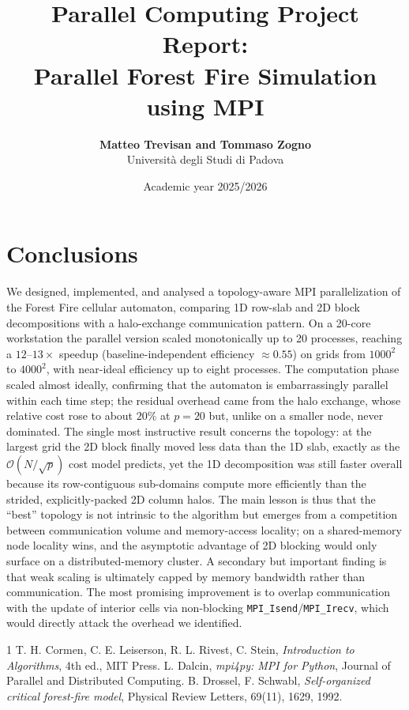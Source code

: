 \documentclass[10pt,a4paper]{article}
\title{\textbf{Parallel Computing Project Report:\\ Parallel Forest Fire Simulation using MPI}}
\author{\textbf{Matteo Trevisan and Tommaso Zogno} \\ Università degli Studi di Padova}
\date{Academic year 2025/2026}
\begin{document}
\maketitle










\section{Conclusions}
We designed, implemented, and analysed a topology-aware MPI parallelization of the Forest Fire cellular automaton, comparing 1D row-slab and 2D block decompositions with a halo-exchange communication pattern. On a 20-core workstation the parallel version scaled monotonically up to 20 processes, reaching a $12$--$13\times$ speedup (baseline-independent efficiency $\approx 0.55$) on grids from $1000^2$ to $4000^2$, with near-ideal efficiency up to eight processes. The computation phase scaled almost ideally, confirming that the automaton is embarrassingly parallel within each time step; the residual overhead came from the halo exchange, whose relative cost rose to about $20\%$ at $p=20$ but, unlike on a smaller node, never dominated. The single most instructive result concerns the topology: at the largest grid the 2D block finally moved less data than the 1D slab, exactly as the $\mathcal{O}(N/\sqrt{p})$ cost model predicts, yet the 1D decomposition was still faster overall because its row-contiguous sub-domains compute more efficiently than the strided, explicitly-packed 2D column halos. The main lesson is thus that the ``best'' topology is not intrinsic to the algorithm but emerges from a competition between communication volume and memory-access locality; on a shared-memory node locality wins, and the asymptotic advantage of 2D blocking would only surface on a distributed-memory cluster. A secondary but important finding is that weak scaling is ultimately capped by memory bandwidth rather than communication. The most promising improvement is to overlap communication with the update of interior cells via non-blocking \texttt{MPI\_Isend}/\texttt{MPI\_Irecv}, which would directly attack the overhead we identified.

\begin{thebibliography}{1}
T. H. Cormen, C. E. Leiserson, R. L. Rivest, C. Stein, \textit{Introduction to Algorithms}, 4th ed., MIT Press.
L. Dalcin, \textit{mpi4py: MPI for Python}, Journal of Parallel and Distributed Computing.
B. Drossel, F. Schwabl, \textit{Self-organized critical forest-fire model}, Physical Review Letters, 69(11), 1629, 1992.
\end{thebibliography}
\end{document}
